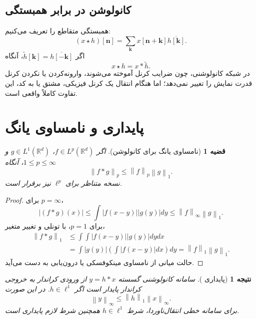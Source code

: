 \documentclass[12pt,openany,oneside]{book}
\newtheorem{theorem}{قضیه}[chapter]
\newtheorem{corollary}{نتیجه}[chapter]
\newcommand{\R}{\mathbb{R}}
\newcommand{\norm}[1]{\left\lVert #1\right\rVert}
\newcommand{\vect}[1]{\bm{#1}}
\begin{document}
\subsection{کانولوشن در برابر همبستگی}
همبستگی متقاطع را تعریف می‌کنیم:
\begin{equation}
(x\star h)[\vect n]=\sum_{\vect k}x[\vect n+\vect k]\overline{h[\vect k]}.
\end{equation}
اگر \(\widetilde h[\vect k]=\overline{h[-\vect k]}\)، آنگاه
\begin{equation}
x\star h=x*\widetilde h.
\end{equation}
در شبکه کانولوشنی، چون ضرایب کرنل آموخته می‌شوند، وارونه‌کردن یا نکردن کرنل قدرت نمایش را تغییر نمی‌دهد؛
اما هنگام انتقال یک کرنل فیزیکی، مشتق یا  به کد، این تفاوت کاملاً واقعی است.

\section{پایداری و نامساوی یانگ}

\begin{theorem}[نامساوی یانگ برای کانولوشن]
اگر \(f\in L^p(\R^d)\)، \(g\in L^1(\R^d)\) و \(1\le p\le\infty\)، آنگاه
\begin{equation}
\norm{f*g}_p\le \norm{f}_p\norm{g}_1.
\label{eq:young}
\end{equation}
نسخه متناظر برای \(\ell^p\) نیز برقرار است.
\end{theorem}

\begin{proof}
برای \(p=\infty\)،
\begin{equation}
|(f*g)(x)|\le\int|f(x-y)||g(y)|dy
\le\norm{f}_\infty\norm{g}_1.
\end{equation}
برای \(p=1\)، با تونلی و تغییر متغیر،
\begin{align}
\norm{f*g}_1
&\le\int\int|f(x-y)||g(y)|dydx\\
&=\int|g(y)|\left(\int|f(x-y)|dx\right)dy
=\norm{f}_1\norm{g}_1.
\end{align}
حالت میانی از نامساوی مینکوفسکی یا درون‌یابی به دست می‌آید.
\end{proof}

\begin{corollary}[پایداری ]
سامانه کانولوشنی گسسته \(y=h*x\) از ورودی کراندار به خروجی کراندار پایدار است اگر
\(h\in\ell^1\). در این صورت
\begin{equation}
\norm{y}_\infty\le\norm{h}_1\norm{x}_\infty.
\end{equation}
برای سامانه خطی انتقال‌ناوردا، شرط \(h\in\ell^1\) همچنین شرط لازم پایداری  است.
\end{corollary}
\end{document}
